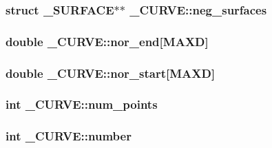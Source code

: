 \subsubsection[{\texorpdfstring{neg\+\_\+surfaces}{neg_surfaces}}]{\setlength{\rightskip}{0pt plus 5cm}struct {\bf \+\_\+\+S\+U\+R\+F\+A\+CE}$\ast$$\ast$ \+\_\+\+C\+U\+R\+V\+E\+::neg\+\_\+surfaces}\hypertarget{struct___c_u_r_v_e_a2c5eb66af09e18ede96bc34c149e845e}{}\label{struct___c_u_r_v_e_a2c5eb66af09e18ede96bc34c149e845e}
\subsubsection[{\texorpdfstring{nor\+\_\+end}{nor_end}}]{\setlength{\rightskip}{0pt plus 5cm}double \+\_\+\+C\+U\+R\+V\+E\+::nor\+\_\+end\mbox{[}{\bf M\+A\+XD}\mbox{]}}\hypertarget{struct___c_u_r_v_e_afed0b7c349f224849682836f5d3cd0f2}{}\label{struct___c_u_r_v_e_afed0b7c349f224849682836f5d3cd0f2}
\subsubsection[{\texorpdfstring{nor\+\_\+start}{nor_start}}]{\setlength{\rightskip}{0pt plus 5cm}double \+\_\+\+C\+U\+R\+V\+E\+::nor\+\_\+start\mbox{[}{\bf M\+A\+XD}\mbox{]}}\hypertarget{struct___c_u_r_v_e_a92aa2f402c793e82b1f8f1275b607122}{}\label{struct___c_u_r_v_e_a92aa2f402c793e82b1f8f1275b607122}
\subsubsection[{\texorpdfstring{num\+\_\+points}{num_points}}]{\setlength{\rightskip}{0pt plus 5cm}int \+\_\+\+C\+U\+R\+V\+E\+::num\+\_\+points}\hypertarget{struct___c_u_r_v_e_aa7fb1a3f9f000489cbbc5ce174dbbe6b}{}\label{struct___c_u_r_v_e_aa7fb1a3f9f000489cbbc5ce174dbbe6b}
\subsubsection[{\texorpdfstring{number}{number}}]{\setlength{\rightskip}{0pt plus 5cm}int \+\_\+\+C\+U\+R\+V\+E\+::number}\hypertarget{struct___c_u_r_v_e_aac932e74b3447d92c752797c714326b5}{}\label{struct___c_u_r_v_e_aac932e74b3447d92c752797c714326b5}
